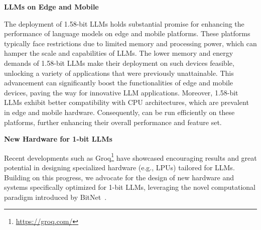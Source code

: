 \textbf{LLMs on Edge and Mobile}

The deployment of 1.58-bit LLMs holds substantial promise for enhancing the performance of language models on edge and mobile platforms. These platforms typically face restrictions due to limited memory and processing power, which can hamper the scale and capabilities of LLMs. The lower memory and energy demands of 1.58-bit LLMs make their deployment on such devices feasible, unlocking a variety of applications that were previously unattainable. This advancement can significantly boost the functionalities of edge and mobile devices, paving the way for innovative LLM applications. Moreover, 1.58-bit LLMs exhibit better compatibility with CPU architectures, which are prevalent in edge and mobile hardware. Consequently,  can be run efficiently on these platforms, further enhancing their overall performance and feature set.

\textbf{New Hardware for 1-bit LLMs}

Recent developments such as Groq\footnote{\url{https://groq.com/}} have showcased encouraging results and great potential in designing specialized hardware (e.g., LPUs) tailored for LLMs. Building on this progress, we advocate for the design of new hardware and systems specifically optimized for 1-bit LLMs, leveraging the novel computational paradigm introduced by BitNet~\cite{bitnet}.

